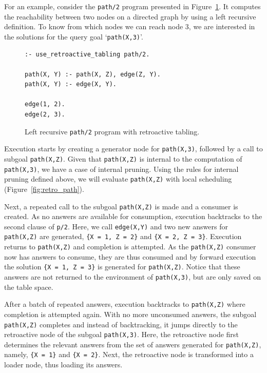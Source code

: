 For an example, consider the \texttt{path/2} program presented in Figure~\ref{fig:retro_path_program}.
It computes the reachability between two nodes on a directed graph by using a left recursive
definition. To know from which nodes we can reach node 3, we are interested in the solutions
for the query goal `\texttt{path(X,3)}'.

\begin{figure}[ht]
\begin{Verbatim}
:- use_retroactive_tabling path/2.

path(X, Y) :- path(X, Z), edge(Z, Y).
path(X, Y) :- edge(X, Y).

edge(1, 2).
edge(2, 3).
\end{Verbatim}
\caption{Left recursive \texttt{path/2} program with retroactive tabling.}
\label{fig:retro_path_program}
\end{figure}

Execution starts by creating a generator node for \texttt{path(X,3)}, followed by a call to
subgoal \texttt{path(X,Z)}. Given that \texttt{path(X,Z)} is internal to the computation of
\texttt{path(X,3)}, we have a case of internal pruning. Using the rules for internal pruning
defined above, we will evaluate \texttt{path(X,Z)} with local scheduling (Figure~\ref{fig:retro_path}).

Next, a repeated call to the subgoal \texttt{path(X,Z)} is made and a consumer is created.
As no answers are available for consumption, execution backtracks to the second clause of \texttt{p/2}.
Here, we call \texttt{edge(X,Y)} and two new answers for \texttt{path(X,Z)} are generated,
\texttt{\{X~=~1,~Z~=~2\}} and \texttt{\{X~=~2,~Z~=~3\}}. Execution returns to \texttt{path(X,Z)} and
completion is attempted. As the \texttt{path(X,Z)} consumer now has answers to consume, they are
thus consumed and by forward execution the solution \texttt{\{X~=~1,~Z~=~3\}}  is generated for
\texttt{path(X,Z)}. Notice that these answers are not returned to the environment of
\texttt{path(X,3)}, but are only saved on the table space.

After a batch of repeated answers, execution backtracks to \texttt{path(X,Z)} where
completion is attempted again. With no more unconsumed answers, the subgoal
\texttt{path(X,Z)} completes and instead of backtracking, it jumps directly to the retroactive node of the subgoal
\texttt{path(X,3)}. Here, the retroactive node first determines the relevant answers from the set of
answers generated for \texttt{path(X,Z)}, namely, \texttt{\{X~=~1\}} and \texttt{\{X~=~2\}}. Next,
the retroactive node is transformed into a loader node, thus loading its answers.

